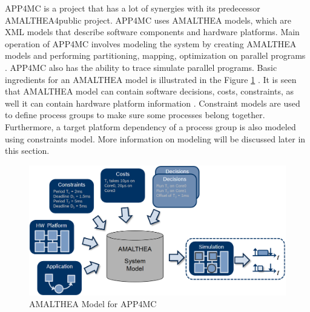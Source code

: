 APP4MC is a project that has a lot of synergies with its predecessor AMALTHEA4public \cite{amalthea4publicweb} project. APP4MC uses AMALTHEA models, which are XML models that describe software components and hardware platforms. Main operation of APP4MC involves modeling the system by creating AMALTHEA models and performing partitioning, mapping, optimization on parallel programs \cite{ICPDSSE}. APP4MC also has the ability to trace simulate parallel programs. Basic ingredients for an AMALTHEA model is illustrated in the Figure \ref{fig:app4mcmodel} \cite{app4mcweb}. It is seen that AMALTHEA model can contain software decisions, costs, constraints, as well it can contain hardware platform information \cite{app4mcweb}. Constraint models are used to define process groups to make sure some processes belong together. Furthermore, a target platform dependency of a process group is also modeled using constraints model. More information on modeling will be discussed later in this section.

\begin{figure}[!ht]
	\centering
	\captionsetup{justification=centering}
	\includegraphics[width=\textwidth]{content/images/app4mcmodel.png}
	\caption{AMALTHEA Model for APP4MC \cite{app4mcweb}}
	\label{fig:app4mcmodel}
\end{figure}


